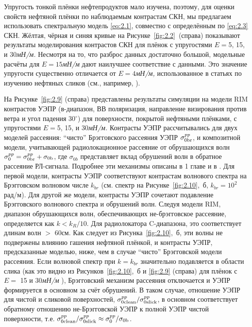Упругость тонкой плёнки нефтепродуктов мало изучена, поэтому, для оценки свойств нефтяной плёнки по наблюдаемым контрастам СКН, мы предлагаем использовать спектральную модель \eqref{eq:2.1}, совместно с определённым по \eqref{eq:2.3} СКН. Жёлтая, чёрная и синяя кривые на Рисунке~\ref{fig:2.2}~(справа) показывают результаты моделирования контрастов СКН для плёнок с упругостями $E=$5, 15, и 30\textit{мН/м.} Несмотря на то, что разброс данных достаточно большой, модельные расчёты для $E=15$\textit{мН/м} дают наилучшее соответствие с данными. Это значение упругости существенно отличается от $E=4$\textit{мН/м,} использованное в статьях по изучению нефтяных сликов (см., например, \citep{2008}).

На Рисунке~\ref{fig:2.9} (справа) представлены результаты симуляции на модели RIM контрастов УЭПР (в-диапазон, ВВ поляризация, направление визирования против ветра и угол падения 30${}^\circ$) для поверхности, покрытой нефтяными плёнками, с упругостями $E=$5, 15, и 30\textit{мН/м.} Контрасты УЭПР рассчитывались для двух моделей рассеяния: ``чисто'' Брэгговского рассеяния УЭПР ${\rm \sigma }_{0{\rm br}}^{pp} $, и композитной модели, учитывающей радиолокационное рассеяние от обрушающихся волн ${\rm \sigma }_{0}^{pp} ={\rm \sigma }_{0{\rm br}}^{pp} +{\rm \sigma }_{0{\rm b}} $, где $\sigma _{0b} $ представляет вклад обрушений волн в обратное рассеяние РЛ-сигнала. Подробнее эти механизмы описаны в 1 главе и в \citep{Kudryavtsev2005}. Для первой модели, контрасты УЭПР соответствуют контрастам волнового спектра на Брэгговском волновом числе $k_{br} $ (см. спектр на Рисунке~\ref{fig:2.10},~б, $k_{br} =10^{2} $рад/м). Для другой же модели, контрасты УЭПР сочетают подавление Брэгговского волнового спектра и обрушений волн. Следуя модели RIM, диапазон обрушающихся волн, обеспечивающих не-брэгговское рассеяние, определяется как $k<k_{R} /10$. Для радиолокатора C-диапазона, это соответствует длинам волн $>$ 60см. Как следует из Рисунка~\ref{fig:2.10},~б, эти волны не подвержены влиянию гашения нефтяной плёнкой, и контрасты УЭПР, предсказанные моделью, ниже, чем в случае ``чисто'' Брэгговской модели рассеяния. Если волновой спектр при $k=k_{br} $ значительно подавляется в области слика (как это видно из Рисунков~\ref{fig:2.10},~б и \ref{fig:2.9} (справа) для плёнок с $E=$ 15 и 30\textit{мН/м }), Брэгговский механизм рассеяния отключается и УЭПР формируется в основном за счёт обрушений. В таком случае, отношение УЭПР для чистой и сликовой поверхностей, ${\rm \sigma }_{0{\rm clean}}^{pp} /{\rm \sigma }_{0{\rm slick}}^{pp} $, в основном соответствует обратному отношению не-Брэгговской УЭПР к полной УЭПР чистой поверхности, т.е. ${\rm \sigma }_{0{\rm clean}}^{pp} /{\rm \sigma }_{0{\rm slick}}^{pp} \approx {\rm \sigma }_{0}^{pp} /{\rm \sigma }_{0{\rm b}} $.

